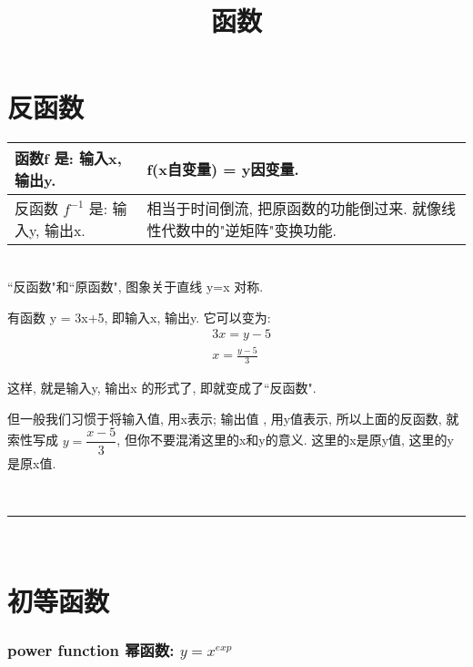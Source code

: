 \documentclass[UTF8]{ctexart}
\title{函数}
\begin{document}
	\tableofcontents %
	\maketitle  %

\part{反函数}



\begin{tabular}{|l| l| }
	\hline
	函数f 是: 输入x, 输出y.
	 &  f(x自变量) = y因变量. \\	 
	\hline	
	
	反函数 $f^{-1}$ 是: 输入y, 输出x. 
	&  相当于时间倒流, 把原函数的功能倒过来. 就像线性代数中的"逆矩阵"变换功能.\\
	\hline
\end{tabular}
\\

``反函数"和``原函数", 图象关于直线 y=x 对称. \\


\begin{tcolorbox}[title = {例},boxrule={0.1em},colframe={black!10}, colback={black!3},colbacktitle={black!10},coltitle={black}]
有函数 y = 3x+5, 即输入x, 输出y. 它可以变为: 
	\begin{align*}
		& 3x = y-5 \\
		& x = \frac{y-5} {3} 
	\end{align*}
	
	这样, 就是输入y, 输出x 的形式了, 即就变成了``反函数".
	
	但一般我们习惯于将输入值, 用x表示; 输出值 , 用y值表示, 所以上面的反函数, 就索性写成  $ y = \dfrac{x-5} {3} $, 但你不要混淆这里的x和y的意义. 这里的x是原y值, 这里的y是原x值.
\end{tcolorbox}


~\\
\hrule
~\\


\part{初等函数}

\section{power function 幂函数:  $ y = x^{exp} $}
\end{document}
